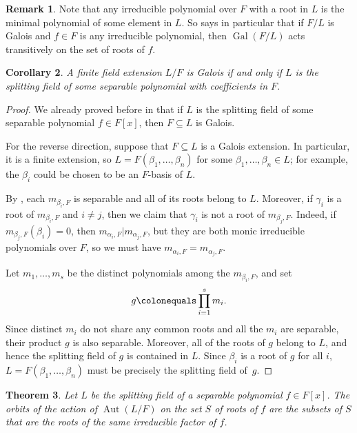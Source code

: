 \documentclass[12pt]{report}
\newtheorem{theorem}{Theorem}[chapter]
\newtheorem{corollary}[theorem]{Corollary}
\numberwithin{equation}{section}
\numberwithin{theorem}{chapter}
\theoremstyle{definition}
\newtheorem*{basic properties}{Basic Properties}
\newtheorem*{Important Remark}{Important Remark}
\newtheorem{remark}[theorem]{Remark}
\DeclareMathOperator{\Gal}{Gal}
\DeclareMathOperator{\Aut}{Aut}
\begin{document}
\begin{remark}
	Note that any irreducible polynomial over $F$ with a root in $L$ is the minimal polynomial of some element in $L$.
So  says in particular that if $F/L$ is Galois and $f \in F$ is any irreducible polynomial, then $\Gal(F/L)$ acts transitively on the set of roots of $f$.
\end{remark}




\begin{corollary}\label{galois iff splitting field of separable poly}
	A finite field extension $L/F$ is Galois if and only if $L$ is the splitting field of some separable polynomial with coefficients in $F$.
\end{corollary}

\begin{proof} 
We already proved before in  that if $L$ is the splitting field of some separable polynomial $f \in F[x]$, then $F \subseteq L$ is Galois. 

For the reverse direction, suppose that $F \subseteq L$ is a Galois extension. In particular, it is a finite extension, so $L = F(\beta_1, \ldots, \beta_n)$ for some $\beta_1, \dots, \beta_n \in L$; for example, the $\beta_i$ could be chosen to be an $F$-basis of $L$.

By , each $m_{\beta_i,F}$ is separable and all of its roots belong to $L$. Moreover, if $\gamma_i$ is a root of $m_{\beta_i,F}$ and $i \neq j$, then we claim that $\gamma_i$ is not a root of $m_{\beta_j,F}$. Indeed, if $m_{\beta_j,F}(\beta_i) = 0$, then $m_{\alpha_i,F} | m_{\alpha_j,F}$, but they are both monic irreducible polynomials over $F$, so we must have $m_{\alpha_i,F} = m_{\alpha_j,F}$.

Let $m_1, \ldots, m_s$ be the distinct polynomials among the $m_{\beta_i,F}$, and set
$$g \colonequals \prod_{i=1}^s m_i.$$ 
Since distinct $m_i$ do not share any common roots and all the $m_i$ are separable, their product $g$ is also separable. Moreover, all of the roots of $g$ belong to $L$, and hence the splitting field of $g$ is contained in $L$. Since $\beta_i$ is a root of $g$ for all $i$, $L = F(\beta_1, \ldots, \beta_n)$ must be precisely the splitting field of~$g$.
\end{proof}


\begin{theorem}
	Let $L$ be the splitting field of a separable polynomial $f \in F[x]$. The orbits of the action of $\Aut(L/F)$ on the set $S$ of roots of $f$ are the subsets of $S$ that are the roots of the same irreducible factor of $f$.
\end{theorem}
\end{document}
